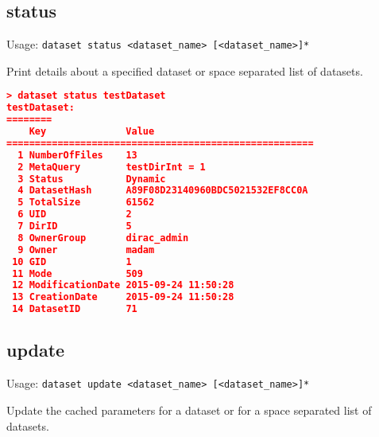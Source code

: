 \subsection{status}

Usage: \texttt{dataset status <dataset\_name> [<dataset\_name>]*}

Print details about a specified dataset or space separated list of
datasets.

\begin{lstlisting}[language=json]
> dataset status testDataset
testDataset:
========
    Key              Value
======================================================
  1 NumberOfFiles    13
  2 MetaQuery        testDirInt = 1
  3 Status           Dynamic
  4 DatasetHash      A89F08D23140960BDC5021532EF8CC0A
  5 TotalSize        61562
  6 UID              2
  7 DirID            5
  8 OwnerGroup       dirac_admin
  9 Owner            madam
 10 GID              1
 11 Mode             509
 12 ModificationDate 2015-09-24 11:50:28
 13 CreationDate     2015-09-24 11:50:28
 14 DatasetID        71
\end{lstlisting}

\subsection{update}

Usage: \texttt{dataset update <dataset\_name> [<dataset\_name>]*}

Update the cached parameters for a dataset or for a space
separated list of datasets.